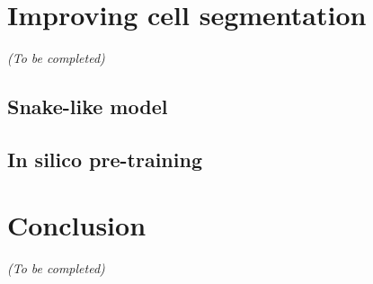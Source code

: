 \section{Improving cell segmentation}
\label{sec:segmentation_improvements}

\begin{center}
	\textit{(To be completed)}
\end{center}

\subsection{Snake-like model}
\label{subsec:segmentation_snake}


\subsection{In silico pre-training}
\label{subsec:segmentation_insilico}


\section{Conclusion}
\label{sec:segmentation_conclusion}

\begin{center}
	\textit{(To be completed)}
\end{center}